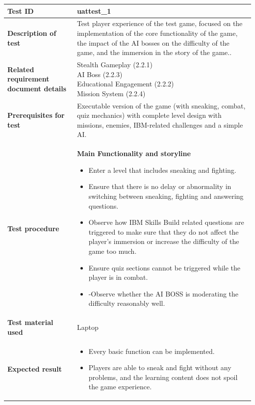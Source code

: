 \documentclass[11pt, a4paper]{article}
\begin{document}
\begin{center}
\begin{tabularx}{\linewidth}{|>{\raggedright\arraybackslash}m{4cm}|X|}
    \hline
    \textbf{Test ID} & uattest\_1 \\
    \hline
    \textbf{Description of test} & Test player experience of the test game, focused on the implementation of the core functionality of the game, the impact of the AI bosses on the difficulty of the game, and the immersion in the story of the game.. \\
    \hline
    \textbf{Related requirement document details} & \makecell[l]{
        Stealth Gameplay (2.2.1) \\
        AI Boss (2.2.3) \\
        Educational Engagement (2.2.2)\\
        Mission System (2.2.4)
    } \\
    \hline
    \textbf{Prerequisites for test} & Executable version of the game (with sneaking, combat, quiz mechanics) with complete level design with missions, enemies, IBM-related challenges and a simple AI. \\
    \hline
    \textbf{Test procedure} &
    \textbf{Main Functionality and storyline}
    \begin{itemize}
        \item Enter a level that includes sneaking and fighting.
        \item Ensure that there is no delay or abnormality in switching between sneaking, fighting and answering questions.
        \item Observe how IBM Skills Build related questions are triggered to make sure that they do not affect the player's immersion or increase the difficulty of the game too much.
        \item Ensure quiz sections cannot be triggered while the player is in combat.
        \item -Observe whether the AI BOSS is moderating the difficulty reasonably well.
    \end{itemize}
    \\
    \hline
    \textbf{Test material used} & Laptop \\
    \hline
    \textbf{Expected result} &
    \begin{itemize}
        \item Every basic function can be implemented.
        \item Players are able to sneak and fight without any problems, and the learning content does not spoil the game experience.

\end{itemize}
\end{tabularx}
\end{center}
\end{document}
